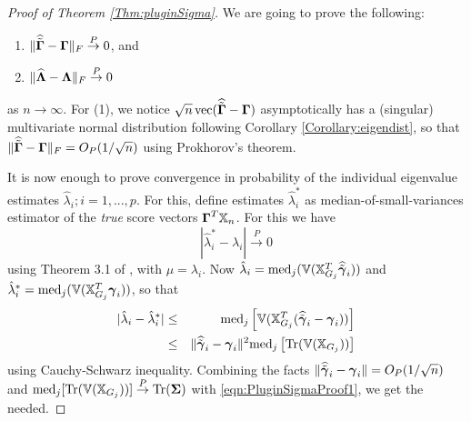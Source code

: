 \begin{proof}[Proof of Theorem \ref{Thm:pluginSigma}]
We are going to prove the following:
%
\begin{enumerate}
\item $\| \widehat{\tilde {{\boldsymbol{\Gamma}}}} - {\boldsymbol{\Gamma}} \|_F \stackrel{P}{\rightarrow} 0$, and

\item $\| \widehat{{\boldsymbol{\Lambda}}} - {\boldsymbol{\Lambda}} \|_F \stackrel{P}{\rightarrow} 0$
\end{enumerate}
%
as $n \rightarrow \infty$. For (1), we notice $\sqrt n \operatorname*{vec} (\widehat{\tilde {{\boldsymbol{\Gamma}}}} - {\boldsymbol{\Gamma}})$ asymptotically has a (singular) multivariate normal distribution following Corollary \ref{Corollary:eigendist}, so that $\| \widehat {\tilde {{\boldsymbol{\Gamma}}}} - {\boldsymbol{\Gamma}} \|_F = O_P(1/\sqrt n)$ using Prokhorov's theorem.

It is now enough to prove convergence in probability of the individual eigenvalue estimates $\hat\lambda_i; i = 1,...,p$. For this, define estimates $\hat \lambda^*_i$ as median-of-small-variances estimator of the \textit{true} score vectors ${\boldsymbol{\Gamma}}^T {\mathbb{X}}_n$. For this we have
%
\begin{equation}\label{eqn:PluginSigmaProof1}
| \hat \lambda^*_i - \lambda_i | \stackrel{P}{\rightarrow} 0
\end{equation}
%
using Theorem 3.1 of \cite{Minsker15}, with $\mu = \lambda_i$. Now $ \hat{\lambda}_i = \text{med}_j ({\mathbb{V}}( {\mathbb{X}}_{G_j}^T \widehat{ \tilde {{\boldsymbol{\gamma}}}}_{i} ))$ and $\hat \lambda^*_i = \text{med}_j ({\mathbb{V}}( {\mathbb{X}}_{G_j}^T {\boldsymbol{\gamma}}_i )) $, so that
%
\begin{eqnarray*}
| \hat {\lambda}_i - \hat \lambda^*_i | &\leq & \text{med}_j \left[ {\mathbb{V}}( {\mathbb{X}}_{G_j}^T ( \widehat{\tilde{{\boldsymbol{\gamma}}}}_{i} - {\boldsymbol{\gamma}}_i) ) \right]
\\ &\leq & \| \widehat{\tilde{{\boldsymbol{\gamma}}}}_{i} - {\boldsymbol{\gamma}}_i \|^2 \text{med}_j  \left[ \text{Tr} ({\mathbb{V}}( {\mathbb{X}}_{G_j})) \right]
\end{eqnarray*}
%
using Cauchy-Schwarz inequality. Combining the facts $ \| \widehat{\tilde{{\boldsymbol{\gamma}}}}_{i} - {\boldsymbol{\gamma}}_i \| = O_P(1/\sqrt n)$ and $ \text{med}_j  [ \text{Tr} ({\mathbb{V}}( {\mathbb{X}}_{G_j})) ] \stackrel{P}{\rightarrow} \text{Tr}({\boldsymbol{\Sigma}})$ \citep{Minsker15} with \ref{eqn:PluginSigmaProof1}, we get the needed.

\end{proof}
